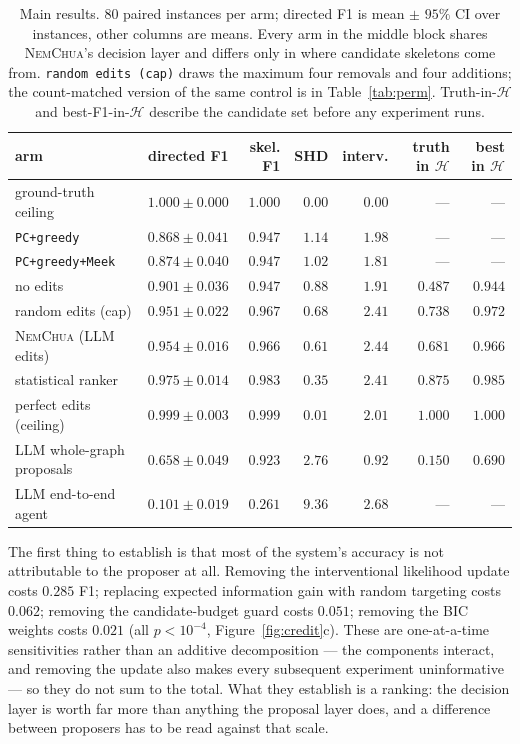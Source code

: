 \documentclass{article}
\newcommand{\nem}{\textsc{NemChua}}
\begin{document}
\begin{table}[t]
\caption{Main results. $80$ paired instances per arm; directed F1 is mean $\pm$ $95\%$ CI over
instances, other columns are means. Every arm in the middle block shares \nem{}'s decision layer and
differs only in where candidate skeletons come from. \texttt{random edits (cap)} draws the maximum
four removals and four additions; the count-matched version of the same control is in
Table~\ref{tab:perm}. Truth-in-$\mathcal{H}$ and best-F1-in-$\mathcal{H}$ describe the candidate set
before any experiment runs.}
\label{tab:main}
\centering
\small
\begin{tabular}{lrrrrrr}
\toprule
arm & directed F1 & skel. F1 & SHD & interv. & truth in $\mathcal{H}$ & best in $\mathcal{H}$ \\
\midrule
ground-truth ceiling      & $1.000 \pm 0.000$ & $1.000$ & $0.00$ & $0.00$ & --- & --- \\
\midrule
\texttt{PC+greedy}        & $0.868 \pm 0.041$ & $0.947$ & $1.14$ & $1.98$ & --- & --- \\
\texttt{PC+greedy+Meek}   & $0.874 \pm 0.040$ & $0.947$ & $1.02$ & $1.81$ & --- & --- \\
\midrule
no edits                  & $0.901 \pm 0.036$ & $0.947$ & $0.88$ & $1.91$ & $0.487$ & $0.944$ \\
random edits (cap)        & $0.951 \pm 0.022$ & $0.967$ & $0.68$ & $2.41$ & $0.738$ & $0.972$ \\
\nem{} (LLM edits)        & $0.954 \pm 0.016$ & $0.966$ & $0.61$ & $2.44$ & $0.681$ & $0.966$ \\
statistical ranker        & $\mathbf{0.975 \pm 0.014}$ & $0.983$ & $0.35$ & $2.41$ & $0.875$ & $0.985$ \\
perfect edits (ceiling)   & $0.999 \pm 0.003$ & $0.999$ & $0.01$ & $2.01$ & $1.000$ & $1.000$ \\
\midrule
LLM whole-graph proposals & $0.658 \pm 0.049$ & $0.923$ & $2.76$ & $0.92$ & $0.150$ & $0.690$ \\
LLM end-to-end agent      & $0.101 \pm 0.019$ & $0.261$ & $9.36$ & $2.68$ & --- & --- \\
\bottomrule
\end{tabular}
\end{table}

The first thing to establish is that most of the system's accuracy is not attributable to the
proposer at all. Removing the interventional likelihood update costs $0.285$ F1; replacing expected
information gain with random targeting costs $0.062$; removing the candidate-budget guard costs
$0.051$; removing the BIC weights costs $0.021$ (all $p<10^{-4}$, Figure~\ref{fig:credit}c). These
are one-at-a-time sensitivities rather than an additive decomposition --- the components interact,
and removing the update also makes every subsequent experiment uninformative --- so they do not sum
to the total. What they establish is a ranking: the decision layer is worth far more than anything
the proposal layer does, and a difference between proposers has to be read against that scale.
\end{document}
